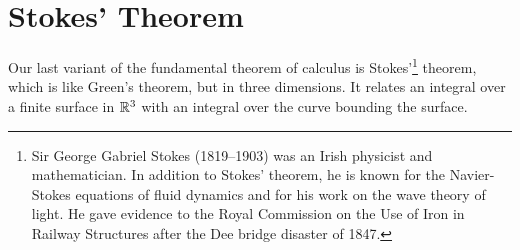 \section{Stokes' Theorem}\label{sec:StokesThm}
Our last variant of the fundamental theorem of calculus is 
Stokes'\footnote{Sir George Gabriel Stokes (1819--1903) was an Irish physicist and mathematician. In addition to Stokes' theorem, he is known for the Navier-Stokes equations of fluid dynamics and for his work on the wave theory
of light. He gave evidence to the Royal Commission on the Use of Iron in 
Railway Structures after the Dee bridge disaster of 1847.} theorem, which is like Green's theorem, but in three dimensions.
It relates an integral over a finite surface 
in $\mathbb{R}^3$ with an integral over the curve bounding the surface. 


